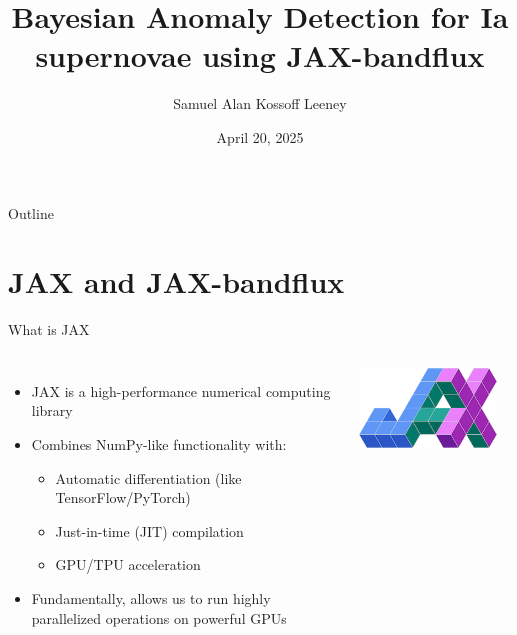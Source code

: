 \documentclass[aspectratio=169]{beamer}
\title{Bayesian Anomaly Detection for Ia supernovae using JAX-bandflux}
\date{April 20, 2025}
\author{Samuel Alan Kossoff Leeney}
\institute{} %
\begin{document}
\begin{frame}
  \titlepage
\end{frame}

\begin{frame}{Outline}
  \tableofcontents[hideallsubsections]
\end{frame}

\section{JAX and JAX-bandflux}

\begin{frame}{What is JAX}
  \begin{columns}
    \begin{itemize}
      \item JAX is a high-performance numerical computing library
      \item Combines NumPy-like functionality with:
        \begin{itemize}
          \item Automatic differentiation (like TensorFlow/PyTorch)
          \item Just-in-time (JIT) compilation
          \item GPU/TPU acceleration
        \end{itemize}
      \item Fundamentally, allows us to run highly parallelized operations on powerful GPUs
    \end{itemize}
    
    \begin{center}
      \includegraphics[width=0.9\textwidth]{images/jax_logo_250px.png}
    \end{center}
  \end{columns}
\end{frame}
\end{document}
